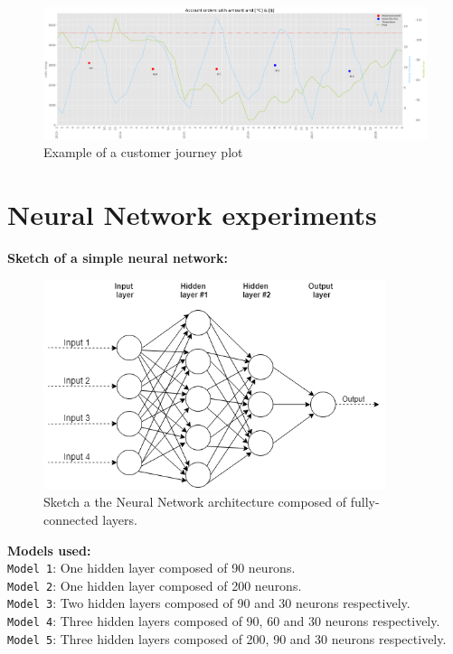 \begin{figure}[h]
    \centering
    \hspace*{-2cm}
    \includegraphics[width=20cm]{images/customer-journey.png}
    \caption{Example of a customer journey plot}
    \label{fig-annex:customer-journey}
\end{figure}



\chapter{Neural Network experiments}
\label{annex:nn-experiments}

\textbf{Sketch of a simple neural network:}
\begin{figure}[h]
    \centering
    \includegraphics[width=10cm]{images/nn-sketch.png}
    \caption{Sketch a the Neural Network architecture composed of fully-connected layers.}
    \label{fig-annex:nn-sketch}
\end{figure}

\textbf{Models used:}\\
\texttt{Model 1}: One hidden layer composed of 90 neurons. \\
\texttt{Model 2}: One hidden layer composed of 200 neurons. \\
\texttt{Model 3}: Two hidden layers composed of 90 and 30 neurons respectively. \\
\texttt{Model 4}: Three hidden layers composed of 90, 60 and 30 neurons respectively. \\
\texttt{Model 5}: Three hidden layers composed of 200, 90 and 30 neurons respectively. \\

